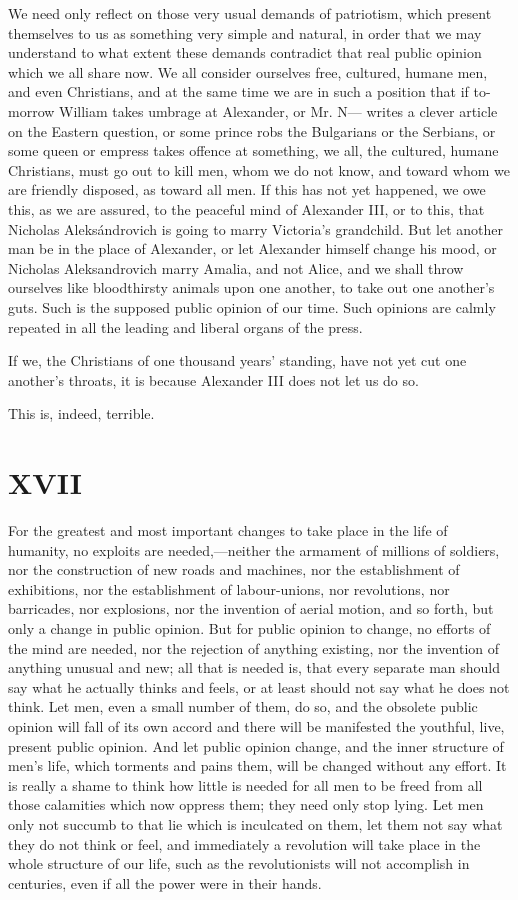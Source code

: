 \documentclass{book}
\begin{document}
We need only reflect on those very usual demands of patriotism, which present themselves to us as something very simple and natural, in order that we may understand to what extent these demands contradict that real public opinion which we all share now. We all consider ourselves free, cultured, humane men, and even Christians, and at the same time we are in such a position that if to-morrow William takes umbrage at Alexander, or Mr. N— writes a clever article on the Eastern question, or some prince robs the Bulgarians or the Serbians, or some queen or empress takes offence at something, we all, the cultured, humane Christians, must go out to kill men, whom we do not know, and toward whom we are friendly disposed, as toward all men. If this has not yet happened, we owe this, as we are assured, to the peaceful mind of Alexander III, or to this, that Nicholas Aleksándrovich is going to marry Victoria’s grandchild. But let another man be in the place of Alexander, or let Alexander himself change his mood, or Nicholas Aleksandrovich marry Amalia, and not Alice, and we shall throw ourselves like bloodthirsty animals upon one another, to take out one another’s guts. Such is the supposed public opinion of our time. Such opinions are calmly repeated in all the leading and liberal organs of the press.

If we, the Christians of one thousand years’ standing, have not yet cut one another’s throats, it is because Alexander III does not let us do so.

This is, indeed, terrible.

\chapter{XVII}
\label{chapter-17}
For the greatest and most important changes to take place in the life of humanity, no exploits are needed,—neither the armament of millions of soldiers, nor the construction of new roads and machines, nor the establishment of exhibitions, nor the establishment of labour-unions, nor revolutions, nor barricades, nor explosions, nor the invention of aerial motion, and so forth, but only a change in public opinion. But for public opinion to change, no efforts of the mind are needed, nor the rejection of anything existing, nor the invention of anything unusual and new; all that is needed is, that every separate man should say what he actually thinks and feels, or at least should not say what he does not think. Let men, even a small number of them, do so, and the obsolete public opinion will fall of its own accord and there will be manifested the youthful, live, present public opinion. And let public opinion change, and the inner structure of men’s life, which torments and pains them, will be changed without any effort. It is really a shame to think how little is needed for all men to be freed from all those calamities which now oppress them; they need only stop lying. Let men only not succumb to that lie which is inculcated on them, let them not say what they do not think or feel, and immediately a revolution will take place in the whole structure of our life, such as the revolutionists will not accomplish in centuries, even if all the power were in their hands.
\end{document}
